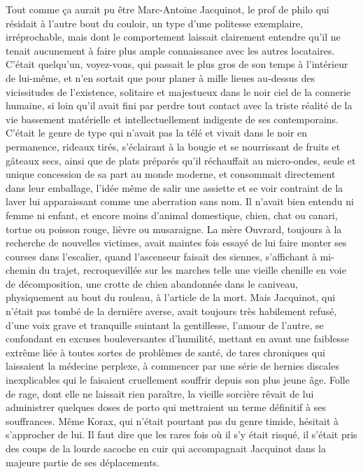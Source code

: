 Tout comme ça aurait pu être Marc-Antoine Jacquinot, le prof de philo qui résidait à l’autre bout du couloir, un type d’une politesse exemplaire, irréprochable, mais dont le comportement laissait clairement entendre qu’il ne tenait aucunement à faire plus ample connaissance avec les autres locataires. C’était quelqu’un, voyez-vous, qui passait le plus gros de son temps à l’intérieur de lui-même, et n’en sortait que pour planer à mille lieues au-dessus des vicissitudes de l’existence, solitaire et majestueux dans le noir ciel de la connerie humaine, si loin qu’il avait fini par perdre tout contact avec la triste réalité de la vie bassement matérielle et intellectuellement indigente de ses contemporains. C’était le genre de type qui n’avait pas la télé et vivait dans le noir en permanence, rideaux tirés, s’éclairant à la bougie et se nourrissant de fruits et gâteaux secs, ainsi que de plats préparés qu’il réchauffait au micro-ondes, seule et unique concession de sa part au monde moderne, et consommait directement dans leur emballage, l’idée même de salir une assiette et se voir contraint de la laver lui apparaissant comme une aberration sans nom. Il n’avait bien entendu ni femme ni enfant, et encore moins d’animal domestique, chien, chat ou canari, tortue ou poisson rouge, lièvre ou musaraigne. La mère Ouvrard, toujours à la recherche de nouvelles victimes, avait maintes fois essayé de lui faire monter ses courses dans l’escalier, quand l’ascenseur faisait des siennes, s’affichant à mi-chemin du trajet, recroquevillée sur les marches telle une vieille chenille en voie de décomposition, une crotte de chien abandonnée dans le caniveau, physiquement au bout du rouleau, à l’article de la mort. Mais Jacquinot, qui n’était pas tombé de la dernière averse, avait toujours très habilement refusé, d’une voix grave et tranquille suintant la gentillesse, l’amour de l’autre, se confondant en excuses bouleversantes d’humilité, mettant en avant une faiblesse extrême liée à toutes sortes de problèmes de santé, de tares chroniques qui laissaient la médecine perplexe, à commencer par une série de hernies discales inexplicables qui le faisaient cruellement souffrir depuis son plus jeune âge. Folle de rage, dont elle ne laissait rien paraître, la vieille sorcière rêvait de lui administrer quelques doses de porto qui mettraient un terme définitif à ses souffrances. Même Korax, qui n’était pourtant pas du genre timide, hésitait à s’approcher de lui. Il faut dire que les rares fois où il s’y était risqué, il s’était pris des coups de la lourde sacoche en cuir qui accompagnait Jacquinot dans la majeure partie de ses déplacements.

